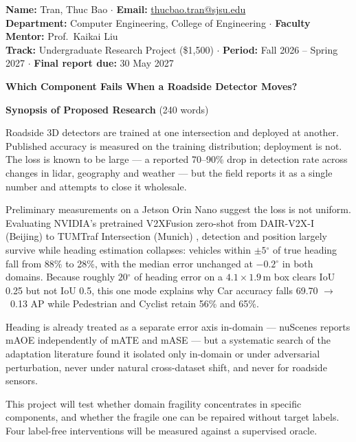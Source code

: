 \documentclass[10pt,letterpaper]{article}
\newcommand{\dg}{\ensuremath{^\circ}}
\newcommand{\too}{\ensuremath{\rightarrow}}
\begin{document}
{\footnotesize
\textbf{Name:} Tran, Thuc Bao \quad$\cdot$\quad
\textbf{Email:} \href{mailto:thucbao.tran@sjsu.edu}{thucbao.tran@sjsu.edu}\\
\textbf{Department:} Computer Engineering, College of Engineering \quad$\cdot$\quad
\textbf{Faculty Mentor:} Prof.\ Kaikai Liu\\
\textbf{Track:} Undergraduate Research Project (\$1,500) \quad$\cdot$\quad
\textbf{Period:} Fall 2026 -- Spring 2027 \quad$\cdot$\quad
\textbf{Final report due:} 30 May 2027\par}

\vspace{5pt}
{\color{dss}\large\bfseries Which Component Fails When a Roadside Detector Moves?\par}
\vspace{3pt}

\begin{mdframed}[linewidth=0pt,leftline=true,linecolor=dssrule,
                 innerleftmargin=9pt,innerrightmargin=7pt,
                 innertopmargin=6pt,innerbottommargin=6pt,
                 backgroundcolor=dssbg,skipabove=5pt,skipbelow=7pt]
{\bfseries\color{dss}Synopsis of Proposed Research} \hfill {\footnotesize (240 words)}

\smallskip
Roadside 3D detectors are trained at one intersection and deployed at another. Published
accuracy is measured on the training distribution; deployment is not. The loss is known to be
large --- a reported 70--90\% drop in detection rate across changes in lidar, geography and
weather \cite{ms3d} --- but the field reports it as a single number and attempts to close it
wholesale.

Preliminary measurements on a Jetson Orin Nano suggest the loss is not uniform. Evaluating
NVIDIA's pretrained V2XFusion \cite{nvidia} zero-shot from DAIR-V2X-I (Beijing) \cite{dair} to
TUMTraf Intersection (Munich) \cite{tumtraf}, detection and position largely survive while
heading estimation collapses: vehicles within $\pm 5\dg$ of true heading fall from 88\% to
28\%, with the median error unchanged at $-0.2\dg$ in both domains. Because roughly $20\dg$ of
heading error on a $4.1 \times 1.9$\,m box clears IoU 0.25 but not IoU 0.5, this one mode
explains why Car accuracy falls 69.70 \too\ 0.13 AP while Pedestrian and Cyclist retain 56\%
and 65\%.

Heading is already treated as a separate error axis in-domain --- nuScenes reports mAOE
independently of mATE and mASE \cite{nuscenes} --- but a systematic search of the adaptation
literature found it isolated only in-domain or under adversarial perturbation, never under
natural cross-dataset shift, and never for roadside sensors.

This project will test whether domain fragility concentrates in specific components, and
whether the fragile one can be repaired without target labels. Four label-free interventions will
be measured against a supervised oracle.
\end{mdframed}
\end{document}
